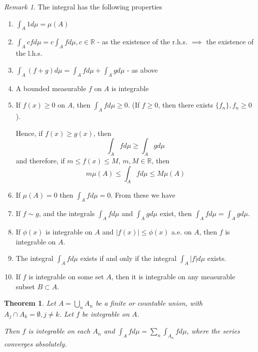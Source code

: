 \documentclass[11pt,a4paper]{report}
\theoremstyle{plain}
\newtheorem{thm}{Theorem}[section]
\theoremstyle{definition}
\theoremstyle{remark}
\newtheorem*{rem}{Remark}
\newcommand{\intersection}{\cap}
\newcommand{\Union}{\bigcup}
\newcommand{\R}{\mathbb{R}}
\newcommand{\abs}[1]{\left| #1 \right|}
\begin{document}
\begin{rem}
    The integral has the following properties
    \begin{enumerate}[label=\Roman*)]
        \item $\int_A 1 d \mu = \mu(A)$
        \item $\int_A c f d\mu = c \int_A f d \mu, c \in \R$ - as the existence of the r.h.s. $\implies$ the existence of the l.h.s.
        \item $\int_A (f + g) d \mu = \int_A f d \mu + \int_A g d \mu$ - as above
        \item A bounded measurable $f$ on $A$ is integrable \label{bounded_measurable_is_integrable}
        \item If $f(x) \ge 0$ on $A$, then $\int_A f d \mu \ge 0$. (If $f \ge 0$, then there exists $\{ f_n \}, f_n \ge 0$).
    
            Hence, if $f(x) \ge g(x)$, then $$ \int_A f d\mu \ge \int_A g d\mu $$ and therefore, if $m \le f(x) \le M$, $m, M \in \R$, then
            $$ m\mu(A) \le \int_A f d\mu \le M\mu(A) $$
    
        \item If $\mu(A) = 0$ then $\int_A f d\mu = 0$. From these we have
        \item If $ f \sim g $, and the integrals $\int_A f d\mu$ and $\int_A g d\mu$ exist, then $\int_A f d\mu = \int_A g d\mu$.
        \item
            If $\phi(x)$ is integrable on $A$ and $\abs{f(x)} \le \phi(x)$ a.e. on $A$, then $f$ is integrable on $A$.
        \item The integral $\int_A f d\mu$ exists if and only if the integral $\int_A \abs{f} d\mu$ exists.
        \item If $f$ is integrable on some set $A$, then it is integrable on any measurable subset $B \subset A$.
    \end{enumerate}
\end{rem}

\begin{thm}
    Let $A = \Union_n A_n$ be a finite or countable union, with $A_j \intersection A_k = \emptyset, j \ne k$. Let $f$ be integrable on $A$.

    Then $f$ is integrable on each $A_n$ and $\int_A f d\mu = \sum_n \int_{A_n} f d \mu$, where the series converges absolutely.
\end{thm}
\end{document}
